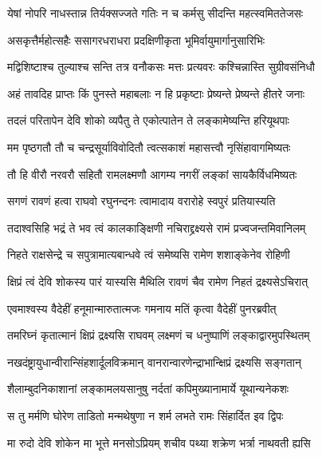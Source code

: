 \twolineshloka
{येषां नोपरि नाधस्तान्न तिर्यक्सज्जते गतिः}
{न च कर्मसु सीदन्ति महत्स्वमिततेजसः} %

\twolineshloka
{असकृत्तैर्महोत्सहैः ससागरधराधरा}
{प्रदक्षिणीकृता भूमिर्वायुमार्गानुसारिभिः} %

\twolineshloka
{मद्विशिष्टाश्च तुल्याश्च सन्ति तत्र वनौकसः}
{मत्तः प्रत्यवरः कश्चिन्नास्ति सुग्रीवसंनिधौ} %

\twolineshloka
{अहं तावदिह प्राप्तः किं पुनस्ते महाबलाः}
{न हि प्रकृष्टाः प्रेष्यन्ते प्रेष्यन्ते हीतरे जनाः} %

\twolineshloka
{तदलं परितापेन देवि शोको व्यपैतु ते}
{एकोत्पातेन ते लङ्कामेष्यन्ति हरियूथपाः} %

\twolineshloka
{मम पृष्ठगतौ तौ च चन्द्रसूर्याविवोदितौ}
{त्वत्सकाशं महासत्त्वौ नृसिंहावागमिष्यतः} %

\twolineshloka
{तौ हि वीरौ नरवरौ सहितौ रामलक्ष्मणौ}
{आगम्य नगरीं लङ्कां सायकैर्विधमिष्यतः} %

\twolineshloka
{सगणं रावणं हत्वा राघवो रघुनन्दनः}
{त्वामादाय वरारोहे स्वपुरं प्रतियास्यति} %

\twolineshloka
{तदाश्वसिहि भद्रं ते भव त्वं कालकाङ्क्षिणी}
{नचिराद्द्रक्ष्यसे रामं प्रज्वजन्तमिवानिलम्} %

\twolineshloka
{निहते राक्षसेन्द्रे च सपुत्रामात्यबान्धवे}
{त्वं समेष्यसि रामेण शशाङ्केनेव रोहिणी} %

\twolineshloka
{क्षिप्रं त्वं देवि शोकस्य पारं यास्यसि मैथिलि}
{रावणं चैव रामेण निहतं द्रक्ष्यसेऽचिरात्} %

\twolineshloka
{एवमाश्वस्य वैदेहीं हनूमान्मारुतात्मजः}
{गमनाय मतिं कृत्वा वैदेहीं पुनरब्रवीत्} %

\twolineshloka
{तमरिघ्नं कृतात्मानं क्षिप्रं द्रक्ष्यसि राघवम्}
{लक्ष्मणं च धनुष्पाणिं लङ्काद्वारमुपस्थितम्} %

\twolineshloka
{नखदंष्ट्रायुधान्वीरान्सिंहशार्दूलविक्रमान्}
{वानरान्वारणेन्द्राभान्क्षिप्रं द्रक्ष्यसि सङ्गतान्} %

\twolineshloka
{शैलाम्बुदनिकाशानां लङ्कामलयसानुषु}
{नर्दतां कपिमुख्यानामार्ये यूथान्यनेकशः} %

\twolineshloka
{स तु मर्मणि घोरेण ताडितो मन्मथेषुणा}
{न शर्म लभते रामः सिंहार्दित इव द्विपः} %

\twolineshloka
{मा रुदो देवि शोकेन मा भूत्ते मनसोऽप्रियम्}
{शचीव पथ्या शक्रेण भर्त्रा नाथवती ह्यसि} %

